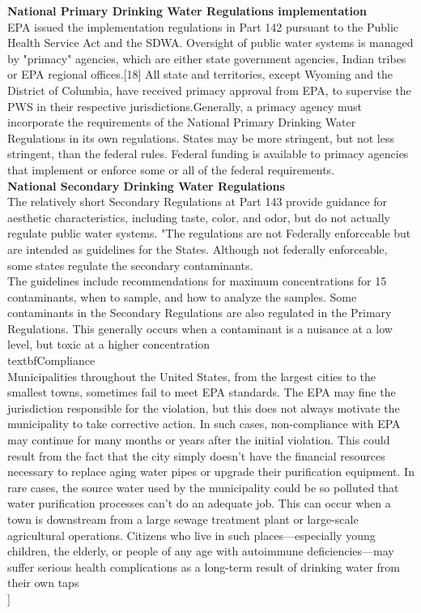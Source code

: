 \documentclass{article}
\begin{document}
\textbf{National Primary Drinking Water Regulations implementation}\\
EPA issued the implementation regulations in Part 142 pursuant to the Public Health Service Act and the SDWA. Oversight of public water systems is managed by "primacy" agencies, which are either state government agencies, Indian tribes or EPA regional offices.[18] All state and territories, except Wyoming and the District of Columbia, have received primacy approval from EPA, to supervise the PWS in their respective jurisdictions.Generally, a primacy agency must incorporate the requirements of the National Primary Drinking Water Regulations in its own regulations. States may be more stringent, but not less stringent, than the federal rules. Federal funding is available to primacy agencies that implement or enforce some or all of the federal requirements.\\
\textbf{National Secondary Drinking Water Regulations}\\
The relatively short Secondary Regulations at Part 143 provide guidance for aesthetic characteristics, including taste, color, and odor, but do not actually regulate public water systems. "The regulations are not Federally enforceable but are intended as guidelines for the States.  Although not federally enforceable, some states regulate the secondary contaminants.\\
The guidelines include recommendations for maximum concentrations for 15 contaminants, when to sample, and how to analyze the samples. Some contaminants in the Secondary Regulations are also regulated in the Primary Regulations. This generally occurs when a contaminant is a nuisance at a low level, but toxic at a higher concentration\\
textbf{Compliance}\\
Municipalities throughout the United States, from the largest cities to the smallest towns, sometimes fail to meet EPA standards. The EPA may fine the jurisdiction responsible for the violation, but this does not always motivate the municipality to take corrective action. In such cases, non-compliance with EPA may continue for many months or years after the initial violation. This could result from the fact that the city simply doesn't have the financial resources necessary to replace aging water pipes or upgrade their purification equipment. In rare cases, the source water used by the municipality could be so polluted that water purification processes can't do an adequate job. This can occur when a town is downstream from a large sewage treatment plant or large-scale agricultural operations. Citizens who live in such places—especially young children, the elderly, or people of any age with autoimmune deficiencies—may suffer serious health complications as a long-term result of drinking water from their own taps\\]
\end{document}
